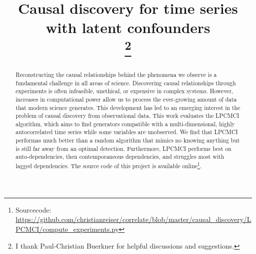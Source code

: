 \documentclass[conference]{IEEEtran}
\begin{document}
\title{Causal discovery for time series with latent confounders\\
\thanks{I thank Paul-Christian Buerkner for helpful discussions and
suggestions.}
}

\author{






}

\maketitle

\begin{abstract}
Reconstructing the causal relationships behind the phenomena we observe is a fundamental challenge in all areas of science.
Discovering causal relationships through experiments is often infeasible, unethical, or expensive in complex systems. 
However, increases in computational power allow us to process the ever-growing amount of data that modern science generates.
This development has led to an emerging interest in the problem of causal discovery from observational data.
This work evaluates the LPCMCI algorithm, which aims to find generators compatible with a multi-dimensional, highly autocorrelated time series while some variables are unobserved.
We find that LPCMCI performas much better than a random algorithm that mimics no knowing anything but is still far away from an optimal detection.
Furthermore, LPCMCI performs best on auto-dependencies, then contemporaneous dependencies, and struggles most with lagged dependencies.
The source code of this project is available online\footnote{Sourcecode: \href{https://github.com/christianreiser/correlate/blob/master/causal_discovery/LPCMCI/compute_experiments.py}{https://github.com/christianreiser/correlate/blob/master/causal\_discovery/LPCMCI/compute\_experiments.py}}.
\end{abstract}
\end{document}
